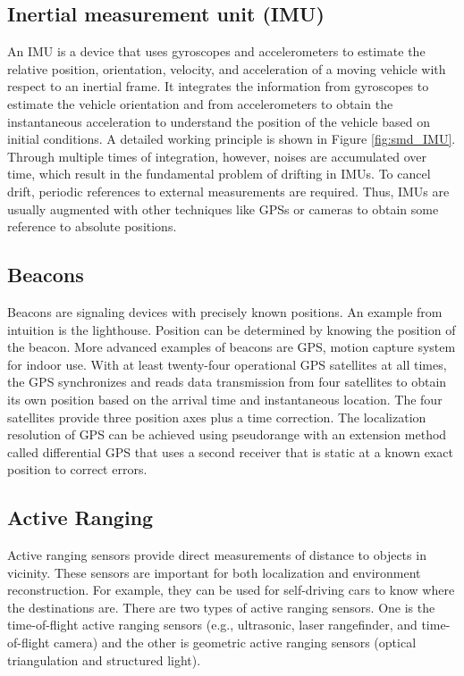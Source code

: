 \begin{itemize}
\subsection{Inertial measurement unit (IMU)}



An IMU is a device that uses gyroscopes and accelerometers to estimate the relative position, orientation, velocity, and acceleration of a moving vehicle with respect to an inertial frame. It integrates the information from gyroscopes to estimate the vehicle orientation and from accelerometers to obtain the instantaneous acceleration to understand the position of the vehicle based on initial conditions. A detailed working principle is shown in Figure \ref{fig:smd_IMU}. Through multiple times of integration, however, noises are accumulated over time, which result in the fundamental problem of drifting in IMUs. To cancel drift, periodic references to external measurements are required. Thus, IMUs are usually augmented with other techniques like GPSs or cameras to obtain some reference to absolute positions.

\subsection{Beacons}
Beacons are signaling devices with precisely known positions. An example from intuition is the lighthouse. Position can be determined by knowing the position of the beacon. More advanced examples of beacons are GPS, motion capture system for indoor use. With at least twenty-four operational GPS satellites at all times, the GPS synchronizes and reads data transmission from four satellites to obtain its own position based on the arrival time and instantaneous location. The four satellites provide three position axes plus a time correction. The localization resolution of GPS can be achieved using pseudorange with an extension method called differential GPS that uses a second receiver that is static at a known exact position to correct errors.

\subsection{Active Ranging}

Active ranging sensors provide direct measurements of distance to objects in vicinity. These sensors are important for both localization and environment reconstruction. For example, they can be used for self-driving cars to know where the destinations are. There are two types of active ranging sensors. One is the time-of-flight active ranging sensors (e.g., ultrasonic, laser rangefinder, and time-of-flight camera) and the other is geometric active ranging sensors (optical triangulation and structured light).



\end{itemize}
